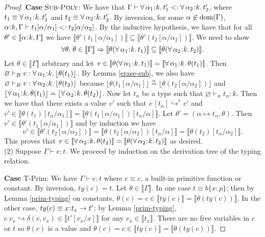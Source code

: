 \documentclass[11pt]{article}
\newcommand{\al}{\alpha}
\newcommand{\bind}{\hspace{0.05em}{:}\hspace{0.05em}} %
\newcommand{\col}{\mathbin{:}}       %
\newcommand{\lb}{\llbracket}         %
\newcommand{\rb}{\rrbracket}         %
\newcommand{\step}{\hookrightarrow}
\newcommand{\many}{\hookrightarrow^*}
\newcommand{\polytype}[3]{\forall\, #1\bind #2.\, #3}
\newcommand{\functype}[3]{#1\bind #2 \rightarrow #3}
\newcommand{\dom}[1]{{\rm dom}(#1)}
\begin{document}
\begin{proof}
{\bf Case} $\textsc{Sub-Poly}$: We have that
$\Gamma \vdash \polytype{\al_1}{k}{t'_1} <: \polytype{\al_2}{k}{t'_2}$, where $t_1 \equiv \polytype{\al_1}{k}{t'_1}$ and $t_2 \equiv \polytype{\al_2}{k}{t'_2}$.
By inversion, for some $\al\not\in\dom{\Gamma}$, $\al\bind k,\Gamma \vdash t_1[\al/\al_1] <: t_2 [\al/\al_2]$.
By the inductive hypothesis, we have that for all $\theta' \in \lb \al\bind k, \Gamma\rb$ we have 
$\lb \theta'(t_1[\al/\al_1]) \rb \subseteq \lb \theta'( t_2[\al/\al_2] )\rb$.
We need to show \[\forall\theta.\; \theta \in \lb\Gamma\rb \Rightarrow \lb \theta(\polytype{\al_1}{k}{t_1})\rb \subseteq \lb \theta(\polytype{\al_2}{k}{t_2})\rb.\] 
Let $\theta \in \lb\Gamma\rb$ arbitrary and let $v \in \lb\theta( \polytype{\al_1}{k}{t_1})\rb = \lb\polytype{\al_1}{k}{\theta(t_1)}\rb$. Then $\varnothing \vdash_B v : \polytype{\al_1}{k}{\lfloor \theta(t_1) \rfloor}$. By Lemma \ref{erase-sub}, we also have $\varnothing \vdash_B v : \polytype{\al_2}{k}{\lfloor \theta(t_2) \rfloor}$ 
because $\lfloor \theta(t_1[\al/\al_1]\rfloor \overset{\al}{=} \lfloor \theta(t_2[\al/\al_2]) \rfloor$ and $\lfloor \polytype{\al_1}{k}{\theta(t_1)} \rfloor = \lfloor \polytype{\al_2}{k}{\theta(t_2)} \rfloor$. 
Now let $t_\al$ be a type such that $\varnothing \vdash_w t_\al : k$. Then we have that there exists a value $v'$ such that 
$v\, [t_\al] \many v'$ and $v' \in \lb \theta(t_1)[t_\al/\al_1]\rb = \lb\theta(t_1[\al/\al_1])[t_\al/\al]\rb.$
Let $\theta' = (\al \mapsto t_\al, \theta)$. Then $v' \in \lb\theta'(t_1[\al/\al_1])\rb$ and by induction we have
\[
v' \in \lb\theta'(t_2[\al/\al_2])\rb = \lb\theta(t_2[\al/\al_2])[t_\al/\al]\rb = \lb \theta(t_2)[t_\al/\al_2]\rb.
\]
This proves that $v \in \lb\polytype{\al_2}{k}{\theta(t_2)}\rb = \lb\theta(\polytype{\al_2}{k}{t_2})\rb$ as desired.\\



(2) Suppose $\Gamma \vdash e : t$. %
We proceed by induction on the derivation tree of the typing relation. 

{\bf Case} {\sc T-Prim}: We have $\Gamma \vdash e : t$ where $e \equiv c$, a built-in primitive function or constant. By inversion, $ty(c) = t$. Let $\theta \in \lb \Gamma \rb$.
In one case $t \equiv b\{x\col p\}$; then by Lemma \ref{prim-typing} on constants, $\theta(c) = c \in \lb ty(c)\rb = \lb \theta(ty(c))\rb$. In the other case, $ty(c) \equiv \functype{x}{t_x}{t'}$; by Lemma \ref{prim-typing},
$c\; v_x \step \delta(c,v_x) \in \lb t'[v_x/x]\rb$ for any $v_x \in \lb t_x\rb.$ There are no free variables in $c$ or $t$ so $\theta(c)$ is a value and $\theta(c) = c \in \lb ty(c)\rb = \lb\theta(ty(c))\rb$.


\end{proof}
\end{document}
